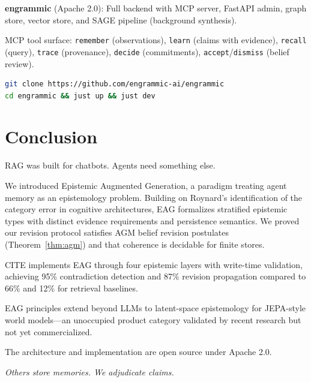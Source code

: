 \documentclass[11pt,a4paper]{article}
\begin{document}
\textbf{engrammic} (Apache 2.0): Full backend with MCP server, FastAPI admin, graph store, vector store, and SAGE pipeline (background synthesis).

MCP tool surface: \texttt{remember} (observations), \texttt{learn} (claims with evidence), \texttt{recall} (query), \texttt{trace} (provenance), \texttt{decide} (commitments), \texttt{accept}/\texttt{dismiss} (belief review).

\begin{lstlisting}[language=bash]
git clone https://github.com/engrammic-ai/engrammic
cd engrammic && just up && just dev
\end{lstlisting}

\section{Conclusion}

RAG was built for chatbots. Agents need something else.

We introduced Epistemic Augmented Generation, a paradigm treating agent memory as an epistemology problem. Building on Roynard's identification of the category error in cognitive architectures, EAG formalizes stratified epistemic types with distinct evidence requirements and persistence semantics. We proved our revision protocol satisfies AGM belief revision postulates (Theorem~\ref{thm:agm}) and that coherence is decidable for finite stores.

CITE implements EAG through four epistemic layers with write-time validation, achieving 95\% contradiction detection and 87\% revision propagation compared to 66\% and 12\% for retrieval baselines.

EAG principles extend beyond LLMs to latent-space epistemology for JEPA-style world models---an unoccupied product category validated by recent research but not yet commercialized.

The architecture and implementation are open source under Apache 2.0.

\begin{center}
\textit{Others store memories. We adjudicate claims.}
\end{center}
\end{document}
